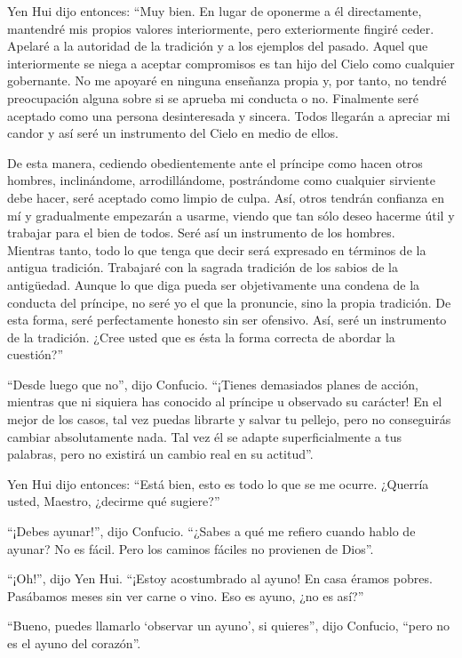 \documentclass[hidelinks]{memoir}
\begin{document}
	Yen Hui dijo entonces: ``Muy bien. En lugar de oponerme a él
	directamente, mantendré mis propios valores interiormente, pero
	exteriormente fingiré ceder. Apelaré a la autoridad de la tradición y a
	los ejemplos del pasado. Aquel que interiormente se niega a aceptar
	compromisos es tan hijo del Cielo como cualquier gobernante. No me
	apoyaré en ninguna enseñanza propia y, por tanto, no tendré preocupación
	alguna sobre si se aprueba mi conducta o no. Finalmente seré aceptado
	como una persona desinteresada y sincera. Todos llegarán a apreciar mi
	candor y así seré un instrumento del Cielo en medio de ellos.
	
	De esta manera, cediendo obedientemente ante el príncipe como hacen
	otros hombres, inclinándome, arrodillándome, postrándome como cualquier
	sirviente debe hacer, seré aceptado como limpio de culpa. Así, otros
	tendrán confianza en mí y gradualmente empezarán a usarme, viendo que
	tan sólo deseo hacerme útil y trabajar para el bien de todos. Seré así
	un instrumento de los hombres.\\
	Mientras tanto, todo lo que tenga que decir será expresado en términos
	de la antigua tradición. Trabajaré con la sagrada tradición de los
	sabios de la antigüedad. Aunque lo que diga pueda ser objetivamente una
	condena de la conducta del príncipe, no seré yo el que la pronuncie,
	sino la propia tradición. De esta forma, seré perfectamente honesto sin
	ser ofensivo. Así, seré un instrumento de la tradición. ¿Cree usted que
	es ésta la forma correcta de abordar la cuestión?''
	
	``Desde luego que no'', dijo Confucio. ``¡Tienes demasiados planes de
	acción, mientras que ni siquiera has conocido al príncipe u observado su
	carácter! En el mejor de los casos, tal vez puedas librarte y salvar tu
	pellejo, pero no conseguirás cambiar absolutamente nada. Tal vez él se
	adapte superficialmente a tus palabras, pero no existirá un cambio real
	en su actitud''.
	
	Yen Hui dijo entonces: ``Está bien, esto es todo lo que se me ocurre.
	¿Querría usted, Maestro, ¿decirme qué sugiere?''
	
	``¡Debes ayunar!'', dijo Confucio. ``¿Sabes a qué me refiero cuando
	hablo de ayunar? No es fácil. Pero los caminos fáciles no provienen de
	Dios''.
	
	``¡Oh!'', dijo Yen Hui. ``¡Estoy acostumbrado al ayuno! En casa éramos
	pobres. Pasábamos meses sin ver carne o vino. Eso es ayuno, ¿no es
	así?''
	
	``Bueno, puedes llamarlo `observar un ayuno', si quieres'', dijo
	Confucio, ``pero no es el ayuno del corazón''.
	
\end{document}
